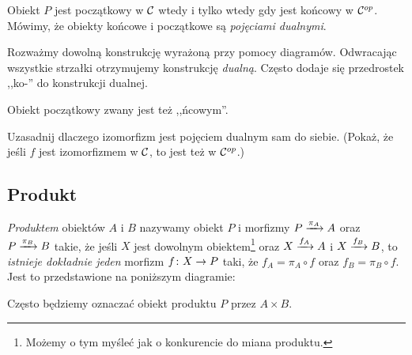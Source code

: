 \begin{exmp}
	Obiekt $P$ jest początkowy w $\C$ wtedy i tylko wtedy gdy jest końcowy w $\op \C$. Mówimy, że obiekty końcowe i początkowe są \emph{pojęciami dualnymi}.
\end{exmp}

\begin{defn}
	Rozważmy dowolną konstrukcję wyrażoną przy pomocy diagramów. Odwracając wszystkie strzałki otrzymujemy konstrukcję \emph{dualną}. Często dodaje się przedrostek ,,ko-'' do konstrukcji dualnej.
\end{defn}

\begin{joke}
	Obiekt początkowy zwany jest też ,,ńcowym''.
\end{joke}

\begin{exc}
	Uzasadnij dlaczego izomorfizm jest pojęciem dualnym sam do siebie. (Pokaż, że jeśli $f$ jest izomorfizmem w $\C$, to jest też w $\op \C$.)
\end{exc}

\subsection{Produkt}
\begin{defn}
	\emph{Produktem} obiektów $A$ i $B$ nazywamy obiekt $P$ i morfizmy $\morpharr {\pi_A}PA$ oraz $\morpharr {\pi_B}PB$ takie, że jeśli $X$ jest dowolnym obiektem\footnote{Możemy o tym myśleć jak o konkurencie do miana produktu.} oraz $\morpharr {f_A}XA$ i $\morpharr {f_B}XB$, to \emph{istnieje dokładnie jeden} morfizm $\morph fXP$ taki, że $f_A=\pi_A\circ f$ oraz $f_B=\pi_B\circ f$.
  Jest to przedstawione na poniższym diagramie:
  \begin{center}
  \end{center}
  Często będziemy oznaczać obiekt produktu $P$ przez $A\times B$.
\end{defn}

